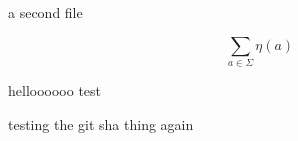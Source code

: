 \documentclass{article}
\begin{document}
a second file

\[
    \sum_{a\in\Sigma} \eta(a)
\]

helloooooo test

testing the git sha thing again
\end{document}
